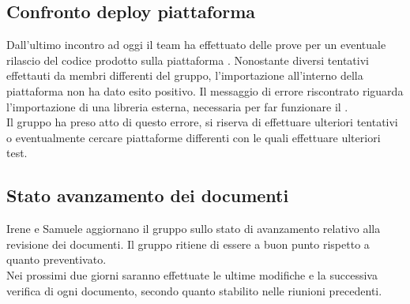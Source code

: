 \subsection{Confronto deploy piattaforma }
Dall'ultimo incontro ad oggi il team ha effettuato delle prove per un eventuale rilascio del codice prodotto sulla piattaforma . 
Nonostante diversi tentativi effettauti da membri differenti del gruppo, l'importazione all'interno della piattaforma non ha dato esito positivo. 
Il messaggio di errore riscontrato riguarda l'importazione di una libreria esterna, necessaria per far funzionare il . \\
Il gruppo ha preso atto di questo errore, si riserva di effettuare ulteriori tentativi o eventualmente cercare piattaforme differenti con le quali effettuare ulteriori test. 


\subsection{Stato avanzamento dei documenti}
Irene e Samuele aggiornano il gruppo sullo stato di avanzamento relativo alla revisione dei documenti. 
Il gruppo ritiene di essere a buon punto rispetto a quanto preventivato. \\
Nei prossimi due giorni saranno effettuate le ultime modifiche e la successiva verifica di ogni documento, secondo quanto stabilito nelle riunioni precedenti. 
